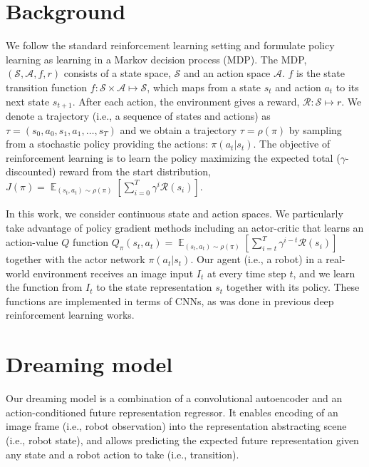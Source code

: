 \documentclass[letterpaper, 10 pt, conference]{ieeeconf}
\DeclareMathOperator{\E}{\mathbb{E}}
\begin{document}
\section{Background}
We follow the standard reinforcement learning setting and formulate policy learning as learning in a Markov decision process (MDP). The MDP, $(\mathcal{S},\mathcal{A},f,r)$ consists of a state space, $\mathcal{S}$ and an action space $\mathcal{A}$. $f$ is the state transition function $f : \mathcal{S}\times\mathcal{A}\mapsto \mathcal{S}$, which maps from a state $s_t$ and action $a_t$ to its next state $s_{t+1}$. After each action, the environment gives a reward, $\mathcal{R}:\mathcal{S}\mapsto r$. We denote a trajectory (i.e., a sequence of states and actions) as $\tau=(s_0,a_0,s_1,a_1,\ldots, s_T)$ and we obtain a trajectory  $\tau=\rho(\pi)$ by sampling from a stochastic policy providing the actions: $\pi(a_t|s_t)$. The objective of reinforcement learning is to learn the policy maximizing the expected total ($\gamma$-discounted) reward from the start distribution, $J(\pi) = \E_{(s_t,a_t)\sim\rho(\pi)} [\sum_{i=0}^T \gamma^{i} \mathcal{R}(s_i)]$.

In this work, we consider continuous state and action spaces. We particularly take advantage of policy gradient methods including an actor-critic that learns an action-value $Q$ function $Q_\pi (s_t,a_t) = \E_{(s_t,a_t)\sim\rho(\pi)} [\sum_{i=t}^T \gamma^{i-t} \mathcal{R}(s_i)]$ together with the actor network $\pi(a_t | s_t)$.
Our agent (i.e., a robot) in a real-world environment receives an image input $I_t$ at every time step $t$, and we learn the function from $I_t$ to the state representation $s_t$ together with its policy. These functions are implemented in terms of CNNs, as was done in previous deep reinforcement learning works.


\section{Dreaming model}

Our dreaming model is a combination of a convolutional autoencoder and an action-conditioned future representation regressor. It enables encoding of an image frame (i.e., robot observation) into the representation abstracting scene (i.e., robot state), and allows predicting the expected future representation given any state and a robot action to take (i.e., transition).
\end{document}
